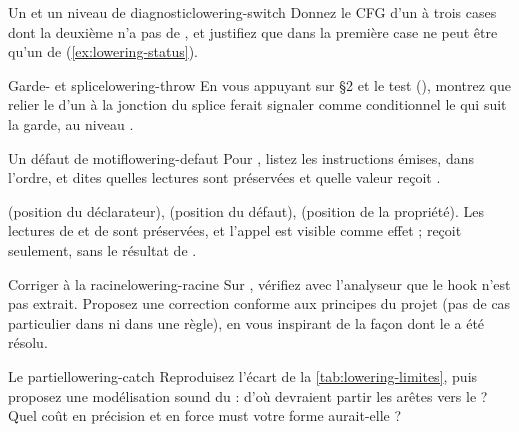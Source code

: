 \begin{exercice}{Un  et un niveau de diagnostic}{lowering-switch}
Donnez le CFG d'un  à trois cases dont la deuxième n'a pas de , et justifiez que  dans la première case ne peut être qu'un \Warning{} de  (\cref{ex:lowering-status}).
\end{exercice}

\begin{exercice}{Garde- et splice}{lowering-throw}
En vous appuyant sur  §2 et le test  (), montrez que relier le  d'un  à la jonction du splice ferait signaler comme conditionnel le  qui suit la garde, au niveau \Error{}.
\end{exercice}

\begin{exercice}{Un défaut de motif}{lowering-defaut}
Pour , listez les instructions émises, dans l'ordre, et dites quelles lectures sont préservées et quelle valeur reçoit .
\end{exercice}
\begin{solution}
 (position du déclarateur),  (position du défaut),  (position de la propriété). Les lectures de  et de  sont préservées, et l'appel  est visible comme effet ;  reçoit  seulement, sans le résultat de .
\end{solution}

\begin{exercice}{Corriger à la racine}{lowering-racine}
Sur , vérifiez avec l'analyseur que le hook n'est pas extrait. Proposez une correction conforme aux principes du projet (pas de cas particulier dans  ni dans une règle), en vous inspirant de la façon dont le  a été résolu.
\end{exercice}

\begin{exercice}{Le  partiel}{lowering-catch}
Reproduisez l'écart  de la \cref{tab:lowering-limites}, puis proposez une modélisation sound du  : d'où devraient partir les arêtes vers le  ? Quel coût en précision et en force must votre forme aurait-elle ?
\end{exercice}
